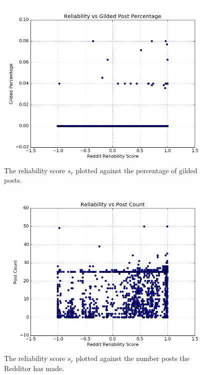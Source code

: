 \begin{figure}[tb]
    \centering
    \includegraphics[width=\linewidth]{figures/reliability_gilded.png}
    \caption{The reliability score $s_r$ plotted against the percentage of gilded posts.}
    \label{fig:reliability_gilded}
\end{figure}

\begin{figure}[tb]
    \centering
    \includegraphics[width=\linewidth]{figures/reliability_post_count.png}
    \caption{The reliability score $s_r$ plotted against the number posts the Redditor has made.}
    \label{fig:reliability_post_count}
\end{figure}

